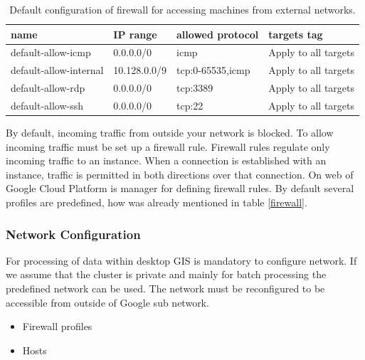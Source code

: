 \documentclass[a4paper,12pt,oneside]{report}
\begin{document}
	\begin{table}[!htbp]
		\centering
		\begin{scriptsize}
			\begin{tabular}{@{}|l|l|l|l|@{}}
				\toprule
				name                   & IP range     & allowed protocol & targets tag         
				\\ \midrule  \midrule
				default-allow-icmp     & 0.0.0.0/0    & icmp             & Apply to all targets
				\\ \midrule
				default-allow-internal & 10.128.0.0/9 & tcp:0-65535,icmp & Apply to all targets
				\\ \midrule
				default-allow-rdp      & 0.0.0.0/0    & tcp:3389         & Apply to all targets
				\\ \midrule
				default-allow-ssh      & 0.0.0.0/0    & tcp:22           & Apply to all targets
				\\ \bottomrule
			\end{tabular}
		\end{scriptsize}
		\caption{Default configuration of firewall for accessing machines from external networks.}
		\label{my-label}
	\end{table}
	By default, incoming traffic from outside your network is blocked. To allow
	incoming traffic must be set up a firewall rule. Firewall rules regulate only incoming
	traffic to an instance. When a connection is established with an instance,
	traffic is permitted in both directions over that connection. On web of Google
	Cloud Platform is manager for defining firewall rules. By default several
	profiles are predefined, how was already mentioned in table \ref{firewall}.
	
	\subsubsection{Network Configuration}\label{network_cfg}
	For  processing of data within desktop GIS is mandatory to configure network. 
	If we assume that the cluster is private and mainly for batch processing the predefined network can be used. The network must be reconfigured to be accessible from outside of Google sub network.
	\begin{itemize}
		\item Firewall profiles
		\item Hosts
	\end{itemize}
	
	
\end{document}
